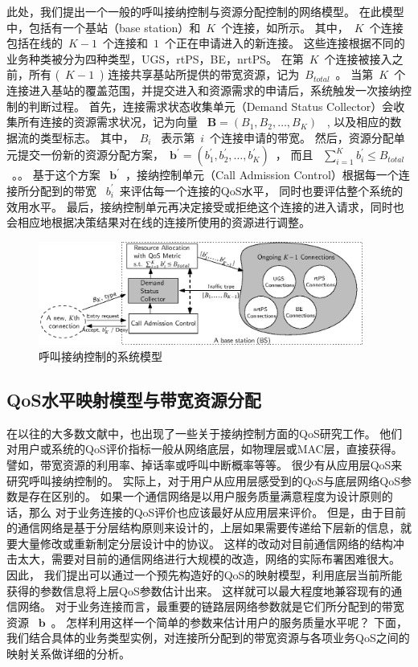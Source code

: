 此处，我们提出一个一般的呼叫接纳控制与资源分配控制的网络模型。
在此模型中，包括有一个基站（base station）和~$K$~个连接，如所示。
其中，~$K$~个连接包括在线的~$K-1$~个连接和~$1$~个正在申请进入的新连接。
这些连接根据不同的业务种类被分为四种类型，UGS，rtPS，BE，nrtPS。
在第~$K$~个连接被接入之前，所有 (~$K-1$~) 连接共享基站所提供的带宽资源，记为~$B_{total}$~。
当第~$K$~个连接进入基站的覆盖范围，并提交进入和资源需求的申请后，系统触发一次接纳控制的判断过程。
首先，连接需求状态收集单元（Demand Status Collector）会收集所有连接的资源需求状况，记为向量 ~$\mathbf{B} = (B_1, B_2, \dots, B_{K})$~ , 以及相应的数据流的类型标志。
其中，~$B_i$~ 表示第~$i$~个连接申请的带宽。
然后，资源分配单元提交一份新的资源分配方案，~$\mathbf{b^\prime} = (b_1^\prime, b_2^\prime, \dots, b_K^\prime)$~， 而且 ~$\sum_{i=1}^K b_i^\prime \le B_{total}$~。。
基于这个方案 ~$\mathbf{b^\prime}$~，接纳控制单元（Call Admission Control）根据每一个连接所分配到的带宽 ~$b_i^\prime$~来评估每一个连接的QoS水平，
同时也要评估整个系统的效用水平。
最后，接纳控制单元再决定接受或拒绝这个连接的进入请求，同时也会相应地根据决策结果对在线的连接所使用的资源进行调整。
\begin{figure}[t]
\centering
\includegraphics[width=0.95\textwidth]{cacop_qos_model_system.eps}
\caption{ 呼叫接纳控制的系统模型} \label{fig_system_model_cac}
\end{figure}
\subsection{QoS水平映射模型与带宽资源分配}
在以往的大多数文献中，也出现了一些关于接纳控制方面的QoS研究工作。
他们对用户或系统的QoS评价指标一般从网络底层，如物理层或MAC层，直接获得。
譬如，带宽资源的利用率、掉话率或呼叫中断概率等等。
很少有从应用层QoS来研究呼叫接纳控制的。
实际上，对于用户从应用层感受到的QoS与底层网络QoS参数是存在区别的。
如果一个通信网络是以用户服务质量满意程度为设计原则的话，那么
对于业务连接的QoS评价也应该最好从应用层来评价。
但是，由于目前的通信网络是基于分层结构原则来设计的，上层如果需要传递给下层新的信息，就要大量修改或重新制定分层设计中的协议。
这样的改动对目前通信网络的结构冲击太大，需要对目前的通信网络进行大规模的改造，网络的实际布署困难很大。
因此，
我们提出可以通过一个预先构造好的QoS的映射模型，利用底层当前所能获得的参数信息将上层QoS参数估计出来。
这样就可以最大程度地兼容现有的通信网络。
对于业务连接而言，最重要的链路层网络参数就是它们所分配到的带宽资源 ~$\mathbf{b}$~。
怎样利用这样一个简单的参数来估计用户的服务质量水平呢？ 
下面，我们结合具体的业务类型实例，对连接所分配到的带宽资源与各项业务QoS之间的映射关系做详细的分析。

